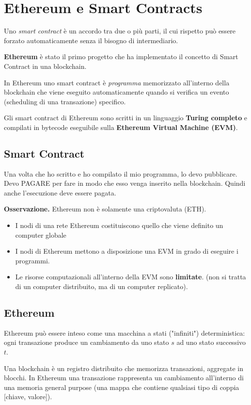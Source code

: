 \documentclass[a4paper]{article}
\begin{document}
\section{Ethereum e Smart Contracts}

\begin{definition}
    Uno \textit{smart contract} è un accordo tra due o più parti, il cui rispetto può essere forzato automaticamente senza il bisogno di intermediario.
\end{definition}
\noindent
\textbf{Ethereum} è stato il primo progetto che ha implementato il concetto di Smart Contract in una blockchain.
\begin{definition}
    In Ethereum uno smart contract è \textit{programma} memorizzato all'interno della blockchain che viene eseguito automaticamente quando si verifica un evento (scheduling di una transazione) specifico.
\end{definition}
\begin{theorem}
    Gli smart contract di Ethereum sono scritti in un linguaggio \textbf{Turing completo} e compilati in bytecode eseguibile sulla \textbf{Ethereum Virtual Machine (EVM)}.
\end{theorem}
\subsection{Smart Contract}
Una volta che ho scritto e ho compilato il mio programma, lo devo pubblicare. Devo PAGARE per fare in modo che esso venga inserito nella blockchain.
Quindi anche l'esecuzione deve essere pagata.

\vspace{1em}
\noindent
\textbf{Osservazione. } Ethereum non è solamente una criptovaluta (ETH).
\begin{itemize}
    \item I nodi di una rete Ethereum costituiscono quello che viene definito un computer globale
    \item I nodi di Ethereum mettono a disposizione una EVM in grado di eseguire i programmi.
    \item Le risorse computazionali all'interno della EVM sono \textbf{limitate}. (non si tratta di un computer distribuito, ma di un computer replicato).
\end{itemize}


\subsection{Ethereum}
\begin{theorem}
    Ethereum può essere inteso come una macchina a stati ("infiniti") deterministica: ogni transazione produce un cambiamento da uno stato $s$ ad uno stato successivo $t$. 
\end{theorem}
\noindent
Una blockchain è un registro distribuito che memorizza transazioni, aggregate in blocchi. 
In Ethereum una transazione rappresenta un cambiamento all'interno di una memoria general purpose (una mappa che contiene qualsiasi tipo di coppia [chiave, valore]).
\end{document}
